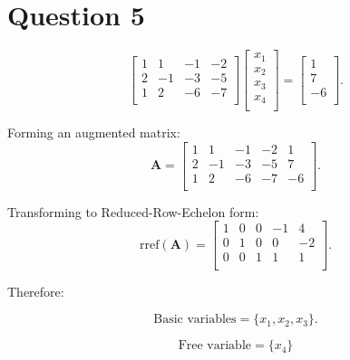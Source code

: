 \documentclass{article}
\begin{document}
\clearpage
\section{Question 5}
\[
\begin{bmatrix}
    1 & 1 & -1 & -2 \\
    2 & -1 & -3  & -5 \\
    1 & 2 & -6 & -7  \\
\end{bmatrix}
\begin{bmatrix}
    x_1 \\ x_2 \\ x_3 \\ x_4 \\
\end{bmatrix}
=
\begin{bmatrix}
    1 \\ 7 \\ -6 \\
\end{bmatrix}
.\]

Forming an augmented matrix:
\[
    \mathbf{A}
    =
    \begin{bmatrix}
        1 & 1 & -1  & -2 & 1  \\
        2 & -1 & -3 & -5 & 7  \\
        1 & 2 & -6  & -7 & -6 \\
    \end{bmatrix}
.\]

Transforming to Reduced-Row-Echelon form:
\[
    \text{rref}(\mathbf{A})
    =
    \begin{bmatrix}
        1 & 0 & 0 & -1  & 4  \\
        0 & 1 & 0 &  0  & -2 \\
        0 & 0 & 1 &  1  & 1  \\
    \end{bmatrix}
.\]
 
Therefore:

\[
    \text{Basic variables} = \{ x_1, x_2, x_3 \}
.\]


\[
    \text{Free variable} = \{ x_4 \}
\]%
\end{document}
